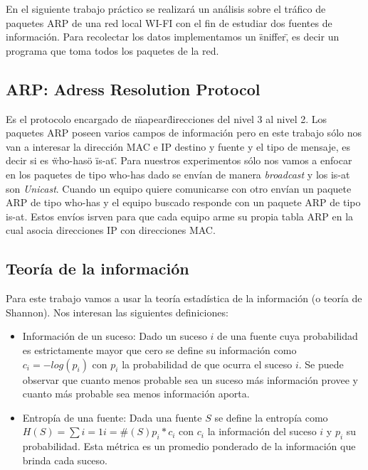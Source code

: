 En el siguiente trabajo pr\'actico se realizar\'a un an\'alisis sobre el tr\'afico de paquetes ARP de una red local WI-FI con el fin de estudiar dos fuentes de informaci\'on. Para recolectar los datos implementamos un \"sniffer\", es decir un programa que toma todos los paquetes de la red. 

\subsection{ARP: Adress Resolution Protocol}

Es el protocolo encargado de \"mapear\" direcciones del nivel 3 al nivel 2. Los paquetes ARP poseen varios campos de informaci\'on pero en este trabajo s\'olo nos van a interesar la direcci\'on MAC e IP destino y fuente y el tipo de mensaje, es decir si es \"who-has\" o \"is-at\".
Para nuestros experimentos s\'olo nos vamos a enfocar en los paquetes de tipo who-has dado se env\'ian de manera \emph{broadcast} y los is-at son \emph{Unicast}. Cuando un equipo quiere comunicarse con otro env\'ian un paquete ARP de tipo who-has y el equipo buscado responde con un paquete ARP de tipo is-at. Estos env\'ios isrven para que cada equipo arme su propia tabla ARP en la cual asocia direcciones IP con direcciones MAC.

\subsection{Teor\'ia de la informaci\'on}

Para este trabajo vamos a usar la teor\'ia estad\'istica de la informaci\'on (o teor\'ia de Shannon). Nos interesan las siguientes definiciones:

\begin{itemize}

\item Informaci\'on de un suceso: Dado un suceso $i$ de una fuente cuya probabilidad es estrictamente mayor que cero se define su informaci\'on como $c_i = -log(p_i)$ con $p_i$ la probabilidad de que ocurra el suceso $i$. Se puede observar que cuanto menos probable sea un suceso m\'as informaci\'on provee y cuanto m\'as probable sea menos informaci\'on aporta.

\item Entrop\'ia de una fuente: Dada una fuente $S$ se define la entrop\'ia como $H(S) = \sum{i=1}{i=\#(S)} p_i*c_i$ con $c_i$ la informaci\'on del suceso $i$ y $p_i$ su probabilidad. Esta m\'etrica es un promedio ponderado de la informaci\'on que brinda cada suceso.  

\end{itemize}

